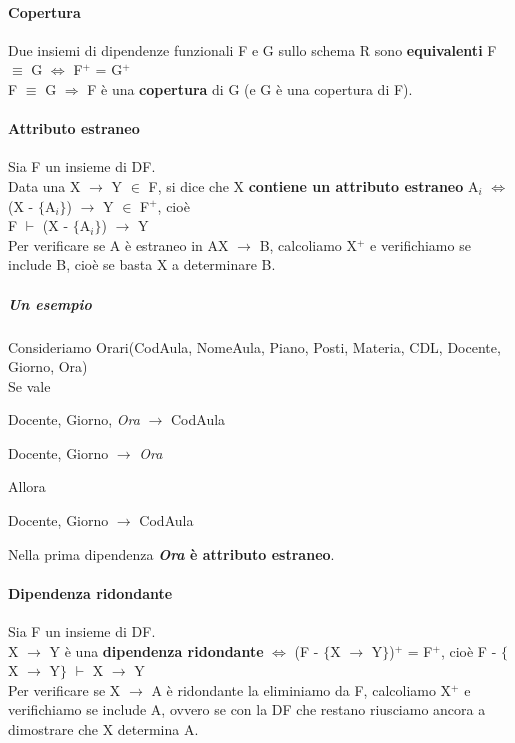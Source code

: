 \documentclass[10pt]{book}
\begin{document}
\paragraph{Copertura} Due insiemi di dipendenze funzionali F e G sullo schema R sono \textbf{equivalenti} F $\equiv$ G $\Leftrightarrow$ F$^+$ = G$^+$\\
F $\equiv$ G $\Rightarrow$ F è una \textbf{copertura} di G (e G è una copertura di F).
\paragraph{Attributo estraneo} Sia F un insieme di DF.\\
Data una X $\rightarrow$ Y $\in$ F, si dice che X \textbf{contiene un attributo estraneo} A$_i$ $\Leftrightarrow$ (X - $\{$A$_i\}$) $\rightarrow$ Y $\in$ F$^+$, cioè\\F $\vdash$ (X - $\{$A$_i\}$) $\rightarrow$ Y\\
Per verificare se A è estraneo in AX $\rightarrow$ B, calcoliamo X$^+$ e verifichiamo se include B, cioè se basta X a determinare B.
\subparagraph{Un esempio} Consideriamo Orari(CodAula, NomeAula, Piano, Posti, Materia, CDL, Docente, Giorno, Ora)\\
Se vale \begin{list}{}{}
	\item Docente, Giorno, \textit{Ora} $\rightarrow$ CodAula
	\item Docente, Giorno $\rightarrow$ \textit{Ora}
\end{list}
Allora \begin{list}{}{}
	\item Docente, Giorno $\rightarrow$ CodAula
\end{list}
Nella prima dipendenza \textbf{\textit{Ora} è attributo estraneo}.
\paragraph{Dipendenza ridondante} Sia F un insieme di DF.\\
X $\rightarrow$ Y è una \textbf{dipendenza ridondante} $\Leftrightarrow$ (F - $\{$X $\rightarrow$ Y$\}$)$^+$ = F$^+$, cioè F - $\{$X $\rightarrow$ Y$\}$ $\vdash$ X $\rightarrow$ Y\\
Per verificare se X $\rightarrow$ A è ridondante la eliminiamo da F, calcoliamo X$^+$ e verifichiamo se include A, ovvero se con la DF che restano riusciamo ancora a dimostrare che X determina A.
\end{document}

